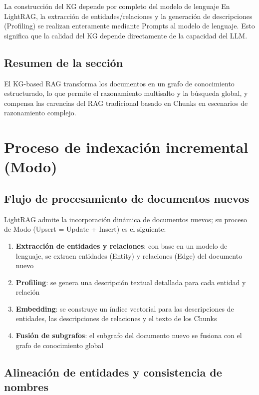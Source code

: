 \documentclass[a4paper]{article}
\begin{document}
\begin{knowledgebox}{La construcción del KG depende por completo del modelo de lenguaje}
En LightRAG, la extracción de entidades/relaciones y la generación de descripciones (Profiling) se realizan enteramente mediante Prompts al modelo de lenguaje. Esto significa que la calidad del KG depende directamente de la capacidad del LLM.
\end{knowledgebox}

\subsection{Resumen de la sección}

El KG-based RAG transforma los documentos en un grafo de conocimiento estructurado, lo que permite el razonamiento multisalto y la búsqueda global, y compensa las carencias del RAG tradicional basado en Chunks en escenarios de razonamiento complejo.

\section{Proceso de indexación incremental (Modo)}

\subsection{Flujo de procesamiento de documentos nuevos}

LightRAG admite la incorporación dinámica de documentos nuevos; su proceso de Modo (Upsert = Update + Insert) es el siguiente:

\begin{enumerate}
    \item \textbf{Extracción de entidades y relaciones}: con base en un modelo de lenguaje, se extraen entidades (Entity) y relaciones (Edge) del documento nuevo
    \item \textbf{Profiling}: se genera una descripción textual detallada para cada entidad y relación
    \item \textbf{Embedding}: se construye un índice vectorial para las descripciones de entidades, las descripciones de relaciones y el texto de los Chunks
    \item \textbf{Fusión de subgrafos}: el subgrafo del documento nuevo se fusiona con el grafo de conocimiento global
\end{enumerate}

\subsection{Alineación de entidades y consistencia de nombres}
\end{document}
